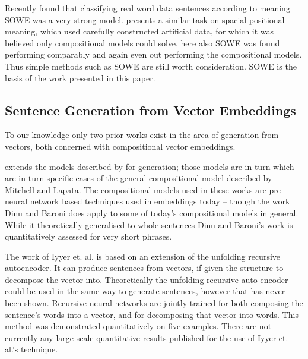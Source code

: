 \documentclass[]{scrartcl}
\numberwithin{equation}{section}
\numberwithin{figure}{section}
\theoremstyle{plain}
\theoremstyle{definition}
\begin{document}
Recently \cite{White2015SentVecMeaning} found that classifying real word data sentences according to meaning SOWE was a very strong model. \cite{RitterPosition} presents a similar task on spacial-positional meaning, which used carefully constructed artificial data, for which it was believed only compositional models could solve, here also SOWE was found performing comparably and again even out performing the compositional models. Thus simple methods such as SOWE are still worth consideration. SOWE is the basis of the work presented in this paper.

\subsection{Sentence Generation from Vector Embeddings}

To our knowledge only two prior works exist in the area of generation from vectors, both concerned with compositional vector embeddings.

\cite{Dinu2014CompositionalGeneration}  extends the models described by \cite{zanzotto2010estimating, Guevara2010} for generation; those models are in turn which are in turn specific cases of the general compositional model described by Mitchell and Lapata\cite{Mitchell2008}. The compositional models used in these works are pre-neural network based techniques used in embeddings today -- though the work Dinu and Baroni does apply to some of today's compositional models in general. While it theoretically generalised to whole sentences Dinu and Baroni's work is quantitatively assessed for very short phrases.


The work of Iyyer et. al. \cite{iyyer2014generating} is based on an extension of the unfolding recursive autoencoder\cite{SocherEtAl2011:PoolRAE}. It can produce sentences from vectors, if given the structure to decompose the vector into. Theoretically the unfolding recursive auto-encoder could be used in the same way to generate sentences, however that has never been shown. Recursive neural networks are jointly trained for both composing the sentence's words into a vector, and for decomposing that vector into words. This method was demonstrated quantitatively on five examples. There are not currently any large scale quantitative results published for the use of Iyyer et. al.'s technique.
\end{document}
